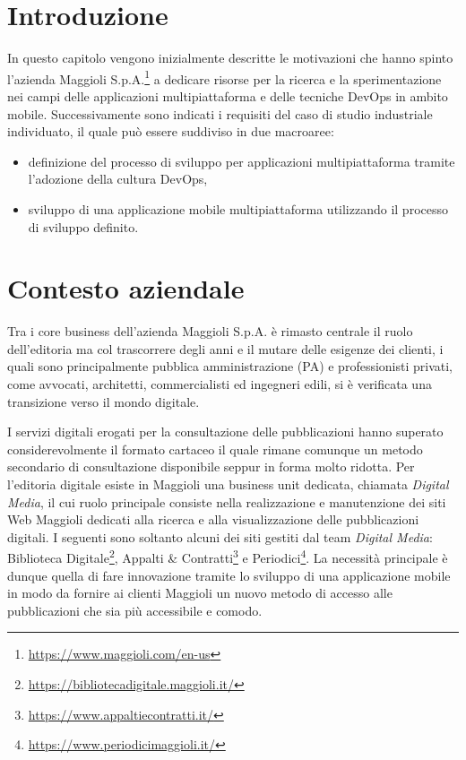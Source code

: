 
\section{Introduzione}

In questo capitolo vengono inizialmente descritte le motivazioni che hanno spinto l'azienda Maggioli S.p.A.\footnote{\href{https://www.maggioli.com/en-us}{https://www.maggioli.com/en-us}} a dedicare risorse per la ricerca e la sperimentazione nei campi delle applicazioni multipiattaforma e delle tecniche DevOps in ambito mobile. Successivamente sono indicati i requisiti del caso di studio industriale individuato, il quale può essere suddiviso in due macroaree:
\begin{itemize}
    \item definizione del processo di sviluppo per applicazioni multipiattaforma tramite l'adozione della cultura DevOps,
    \item sviluppo di una applicazione mobile multipiattaforma utilizzando il processo di sviluppo definito.
\end{itemize}

\section{Contesto aziendale}
Tra i core business dell'azienda Maggioli S.p.A. è rimasto centrale il ruolo dell'editoria ma col trascorrere degli anni e il mutare delle esigenze dei clienti, i quali sono principalmente pubblica amministrazione (PA) e professionisti privati, come avvocati, architetti, commercialisti ed ingegneri edili, si è verificata una transizione verso il mondo digitale.

I servizi digitali erogati per la consultazione delle pubblicazioni hanno superato considerevolmente il formato cartaceo il quale rimane comunque un metodo secondario di consultazione disponibile seppur in forma molto ridotta. Per l'editoria digitale esiste in Maggioli una business unit dedicata, chiamata \textit{Digital Media}, il cui ruolo principale consiste nella realizzazione e manutenzione dei siti Web Maggioli dedicati alla ricerca e alla visualizzazione delle pubblicazioni digitali. I seguenti sono soltanto alcuni dei siti gestiti dal team \textit{Digital Media}: Biblioteca Digitale\footnote{\href{https://bibliotecadigitale.maggioli.it/}{https://bibliotecadigitale.maggioli.it/}}, Appalti \& Contratti\footnote{\href{https://www.appaltiecontratti.it/}{https://www.appaltiecontratti.it/}} e Periodici\footnote{\href{https://www.periodicimaggioli.it/}{https://www.periodicimaggioli.it/}}. La necessità principale è dunque quella di fare innovazione tramite lo sviluppo di una applicazione mobile in modo da fornire ai clienti Maggioli un nuovo metodo di accesso alle pubblicazioni che sia più accessibile e comodo. 

